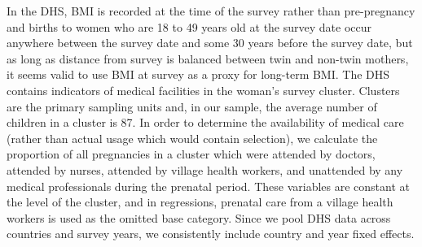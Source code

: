 \documentclass{nature}
\begin{document}
\begin{linenumbers}
In the DHS, BMI is recorded at the time of the survey rather than pre-pregnancy and births to women who are 18 to 49 years old at the survey date occur anywhere between the survey date and some 30 years before the survey date, but as long as distance from survey is balanced between twin and non-twin mothers, it seems valid to use BMI at survey as a proxy for long-term BMI. The DHS contains indicators of medical facilities in the woman's survey cluster. Clusters  are the primary sampling units and, in our sample, the average number of children in a cluster is 87. In order to determine the availability of medical care (rather than actual usage which would contain selection), we calculate the proportion of all pregnancies in a cluster which were attended by doctors, attended by nurses, attended by village health workers, and unattended by any medical professionals during the prenatal period. These variables are constant at the level of the cluster, and in regressions, prenatal care from a village health workers is used as the omitted base category. Since we pool DHS data across countries and survey years, we consistently include country and year fixed effects. %


\end{linenumbers}
\end{document}
